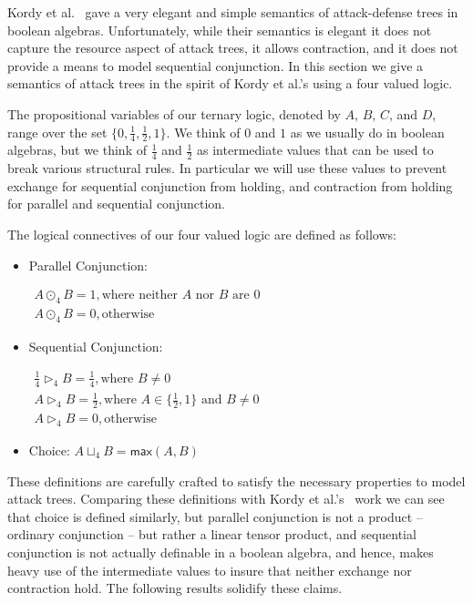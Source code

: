 \newcommand{\forth}{\frac{1}{4}}
\newcommand{\half}{\frac{1}{2}}

Kordy et al.~\cite{Kordy:2012} gave a very elegant and simple
semantics of attack-defense trees in boolean algebras.  Unfortunately,
while their semantics is elegant it does not capture the resource
aspect of attack trees, it allows contraction, and it does not provide
a means to model sequential conjunction.  In this section we give a
semantics of attack trees in the spirit of Kordy et al.'s using a four
valued logic.

The propositional variables of our ternary logic, denoted by $A$, $B$,
$C$, and $D$, range over the set $\{0, \forth, \half, 1\}$.  We think
of $0$ and $1$ as we usually do in boolean algebras, but we think of
$\forth$ and $\half$ as intermediate values that can be used to break
various structural rules.  In particular we will use these values to
prevent exchange for sequential conjunction from holding, and
contraction from holding for parallel and sequential conjunction.
\begin{definition}
  \label{def:logical-connectives}
  The logical connectives of our four valued logic are defined as
  follows:
  \begin{itemize}
  \item[] Parallel Conjunction:
    \begin{center}
      \begin{math}
        \begin{array}{lll}
          A \odot_4 B = 1, \text{where neither $A$ nor $B$ are $0$}\\
          A \odot_4 B = 0, \text{otherwise}
        \end{array}
      \end{math}
    \end{center}
  \item[] Sequential Conjunction:
    \begin{center}
      \begin{math}
        \begin{array}{lll}
          \forth \rhd_4 B = \forth, \text{where $B \neq 0$}\\[2px]         
          A \rhd_4 B = \half, \text{where } A \in \{\half, 1\} \text{ and } B \neq 0\\
          A \rhd_4 B = 0, \text{otherwise}
        \end{array}
      \end{math}
    \end{center}
  \item[] Choice: $A \sqcup_4 B = \mathsf{max}(A,B)$    
  \end{itemize}
\end{definition}
These definitions are carefully crafted to satisfy the necessary
properties to model attack trees.  Comparing these definitions with
Kordy et al.'s~\cite{Kordy:2012} work we can see that choice is
defined similarly, but parallel conjunction is not a product --
ordinary conjunction -- but rather a linear tensor product, and
sequential conjunction is not actually definable in a boolean algebra,
and hence, makes heavy use of the intermediate values to insure that
neither exchange nor contraction hold.  The following results solidify
these claims.

